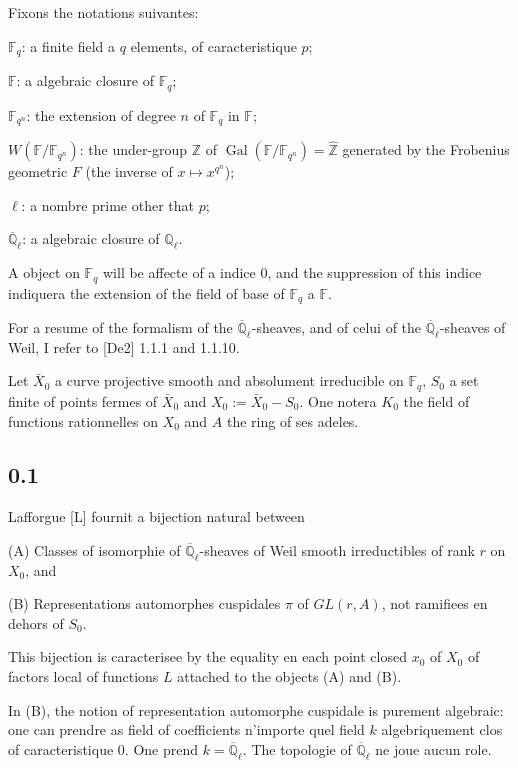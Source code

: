 \documentclass[11pt,a4paper]{article}
\theoremstyle{plain}
\theoremstyle{definition}
\DeclareMathOperator{\Gal}{Gal}
\begin{document}
Fixons the notations suivantes:

$\mathbb{F}_q$: a finite field a $q$ elements, of caracteristique $p$;

$\mathbb{F}$: a algebraic closure of $\mathbb{F}_q$;

$\mathbb{F}_{q^n}$: the extension of degree $n$ of $\mathbb{F}_q$ in $\mathbb{F}$;

$W(\mathbb{F}/\mathbb{F}_{q^n})$: the under-group $\mathbb{Z}$ of $\Gal(\mathbb{F}/\mathbb{F}_{q^n}) = \hat{\mathbb{Z}}$ generated by the Frobenius geometric $F$ (the inverse of $x \mapsto x^{q^n}$);

$\ell$: a nombre prime other that $p$;

$\overline{\mathbb{Q}}_\ell$: a algebraic closure of $\mathbb{Q}_\ell$.

A object on $\mathbb{F}_q$ will be affecte of a indice $0$, and the suppression of this indice indiquera the extension of the field of base of $\mathbb{F}_q$ a $\mathbb{F}$.

For a resume of the formalism of the $\overline{\mathbb{Q}}_\ell$-sheaves, and of celui of the $\overline{\mathbb{Q}}_\ell$-sheaves of Weil, I refer to [De2] 1.1.1 and 1.1.10.

Let $\bar{X}_0$ a curve projective smooth and absolument irreducible on $\mathbb{F}_q$, $S_0$ a set finite of points fermes of $\bar{X}_0$ and $X_0 := \bar{X}_0 - S_0$. One notera $K_0$ the field of functions rationnelles on $X_0$ and $A$ the ring of ses adeles.

\subsection*{0.1}

Lafforgue [L] fournit a bijection natural between

(A) Classes of isomorphie of $\overline{\mathbb{Q}}_\ell$-sheaves of Weil smooth irreductibles of rank $r$ on $X_0$, and

(B) Representations automorphes cuspidales $\pi$ of $GL(r,A)$, not ramifiees en dehors of $S_0$.

This bijection is caracterisee by the equality en each point closed $x_0$ of $X_0$ of factors local of functions $L$ attached to the objects (A) and (B).

In (B), the notion of representation automorphe cuspidale is purement algebraic: one can prendre as field of coefficients n'importe quel field $k$ algebriquement clos of caracteristique $0$. One prend $k = \overline{\mathbb{Q}}_\ell$. The topologie of $\overline{\mathbb{Q}}_\ell$ ne joue aucun role.
\end{document}
